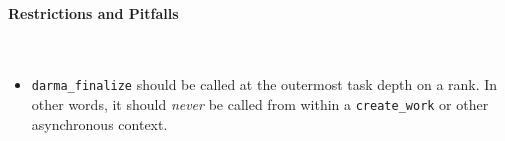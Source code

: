 \paragraph{Restrictions and Pitfalls}\mbox{} \\
\begin{itemize}
  \item \texttt{darma\_finalize} should be called at the outermost task depth on
  a rank.  In other words, it should {\it never} be called from within a
  \texttt{create\_work} or other asynchronous context.
\end{itemize}




